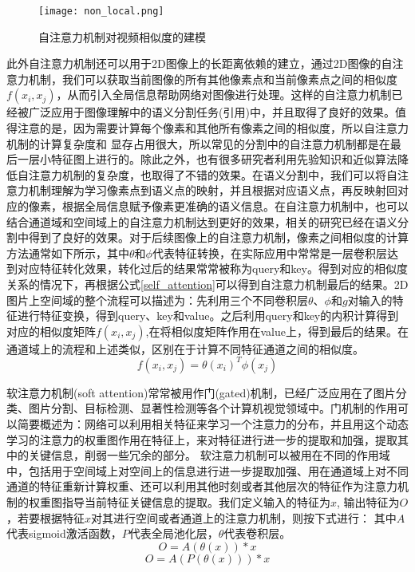 \documentclass[master]{thesis-uestc}
\begin{document}
\begin{figure}[h]
    \texttt{[image: non\_local.png]}
    \caption{自注意力机制对视频相似度的建模}
    \label{non_local}
\end{figure}

此外自注意力机制还可以用于2D图像上的长距离依赖的建立，通过2D图像的自注意力机制，我们可以获取当前图像的所有其他像素点和当前像素点之间的相似度$f(x_i, x_j)$，从而引入全局信息帮助网络对图像进行处理。这样的自注意力机制已经被广泛应用于图像理解中的语义分割任务(引用)中，并且取得了良好的效果。值得注意的是，因为需要计算每个像素和其他所有像素之间的相似度，所以自注意力机制的计算复杂度和 显存占用很大，所以常见的分割中的自注意力机制都是在最后一层小特征图上进行的。除此之外，也有很多研究者利用先验知识和近似算法降低自注意力机制的复杂度，也取得了不错的效果。在语义分割中，我们可以将自注意力机制理解为学习像素点到语义点的映射，并且根据对应语义点，再反映射回对应的像素，根据全局信息赋予像素更准确的语义信息。在自注意力机制中，也可以结合通道域和空间域上的自注意力机制达到更好的效果，相关的研究已经在语义分割中得到了良好的效果。对于后续图像上的自注意力机制，像素之间相似度的计算方法通常如下所示，其中$\theta$和$\phi$代表特征转换，在实际应用中常常是一层卷积层达到对应特征转化效果，转化过后的结果常常被称为query和key。得到对应的相似度关系的情况下，再根据公式\eqref{self_attention}可以得到自注意力机制最后的结果。2D图片上空间域的整个流程可以描述为：先利用三个不同卷积层$\theta$、$\phi$和$g$对输入的特征进行特征变换，得到query、key和value。之后利用query和key的内积计算得到对应的相似度矩阵$f(x_i, x_j)$,在将相似度矩阵作用在value上，得到最后的结果。在通道域上的流程和上述类似，区别在于计算不同特征通道之间的相似度。
\begin{equation}
    f(x_i, x_j) = \theta(x_i)^T \phi (x_j)
\end{equation}

软注意力机制(soft attention)常常被用作门(gated)机制，已经广泛应用在了图片分类、图片分割、目标检测、显著性检测等各个计算机视觉领域中。门机制的作用可以简要概述为：网络可以利用相关特征来学习一个注意力的分布，并且用这个动态学习的注意力的权重图作用在特征上，来对特征进行进一步的提取和加强，提取其中的关键信息，削弱一些冗余的部分。 软注意力机制可以被用在不同的作用域中，包括用于空间域上对空间上的信息进行进一步提取加强、用在通道域上对不同通道的特征重新计算权重、还可以利用其他时刻或者其他层次的特征作为注意力机制的权重图指导当前特征关键信息的提取。我们定义输入的特征为$x$, 输出特征为$O$，若要根据特征$x$对其进行空间或者通道上的注意力机制，则按下式进行： 其中$A$代表sigmoid激活函数，$P$代表全局池化层，$\theta$代表卷积层。
\begin{equation}
    \label{spatial_attention}
    O = A(\theta(x)) *  x 
\end{equation}
\begin{equation}
    \label{channel_attention}
    O = A(P(\theta(x))) *  x 
\end{equation}
\end{document}
